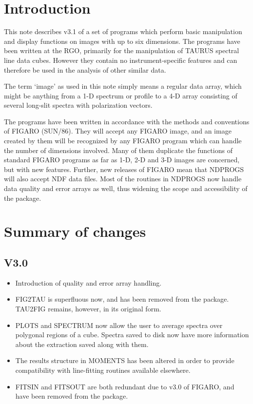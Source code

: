 \newpage

\section{Introduction}

This note describes v3.1 of a set of programs which perform basic manipulation 
and display functions on images with up to six dimensions. The programs have 
been written at the RGO, primarily for the manipulation of TAURUS spectral line
data cubes. However they contain no instrument-specific features and can 
therefore be used in the analysis of other similar data. 

The term `image' as used in this note simply means a regular data array, which 
might be anything from a 1-D spectrum or profile to a 4-D array consisting
of several long-slit spectra with polarization vectors. 

The programs have been written in accordance with the methods and conventions 
of FIGARO (SUN/86). They will accept any FIGARO image, and an image 
created by them will be recognized by any FIGARO program which can handle the 
number of dimensions involved. Many of them duplicate the functions of 
standard FIGARO programs as far as 1-D, 2-D and 3-D images are concerned, but 
with new features. Further, new releases of FIGARO mean that NDPROGS will also
accept
NDF data files. Most of the routines in NDPROGS now handle data quality
and error arrays as well, thus widening the scope and accessibility of the
package.

\section{Summary of changes}

\subsection{V3.0}

\begin{itemize}
\item Introduction of quality and error array handling.
\item FIG2TAU is superfluous now, and has been removed from the package. 
TAU2FIG remains, however, in its original form.
\item PLOTS and SPECTRUM now allow the user to average spectra over polygonal
regions of a cube. Spectra saved to disk now have more information about the
extraction saved along with them.
\item The results structure in MOMENTS has been altered
in order to provide compatibility with line-fitting routines available 
elsewhere.
\item FITSIN and FITSOUT are both redundant due to v3.0 of FIGARO,
and have been removed from the package.
\end{itemize}

